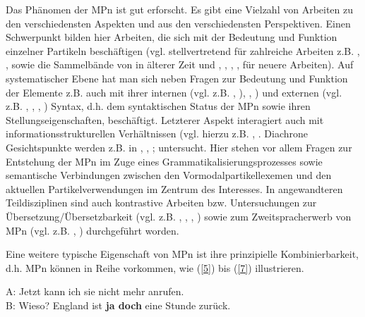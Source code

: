 Das Phänomen der MPn ist gut erforscht. Es gibt eine Vielzahl von Arbeiten zu den verschiedensten Aspekten und aus den verschiedensten Perspektiven. Einen Schwerpunkt bilden hier Arbeiten, die sich mit der Bedeutung und Funktion einzelner Partikeln beschäftigen (vgl. stellvertretend für zahlreiche Arbeiten z.B. \citealt{Franck1980}, \citealt{Hentschel1986}, \citealt{Thurmair1989} sowie die Sammelbände von \citealt{Weydt1977, Weydt1979, Weydt1983a, Weydt1986} in älterer Zeit und \citealt{Karagjosova2003, Karagjosova2004}, \citealt{Zimmermann2011}, \citealt{Egg2013}, \citealt{Mueller2014a, Mueller2016a}, \citealt{Gutzmann2015} für neuere Arbeiten). Auf systematischer Ebene hat man sich neben Fragen zur Bedeutung und Funktion der Elemente z.B. auch mit ihrer internen (vgl. z.B. \citealt[50-63]{Meibauer1994}, \citealt[37-41]{Ormelius-Sandblom1997}), \citealt[99-104]{Coniglio2011}, \citealt{Struckmeier2014}) und externen (vgl. z.B. \citealt[32-36, 43-45]{Ormelius-Sandblom1997}, \citealt[104-115]{Coniglio2011}, \citealt{Abraham1995, Abraham2012}, \citealt{Gutzmann2016}) Syntax, d.h. dem syntaktischen Status der MPn sowie ihren Stellungseigenschaften, beschäftigt. Letz\-terer Aspekt interagiert auch mit informationsstrukturellen Verhältnissen (vgl. hierzu z.B. \citealt[73-87]{Meibauer1994}, \citealt[101-115]{Ormelius-Sandblom1997}. Diachrone Gesichtspunkte werden z.B. in \citet[Kapitel 3]{Hentschel1986}, \citet[158-170]{Meibauer1994}, \citet[Kapitel 4.2]{Diewald1997}; \citeyearpar{ Diewald2008} untersucht. Hier stehen vor allem Fragen zur Entstehung der MPn im Zuge eines Grammatikalisierungsprozesses sowie semantische Verbindungen zwischen den Vormodalpartikellexemen und den aktuellen Partikelverwendungen im Zentrum des Interesses. In angewandteren Teildisziplinen sind auch kontrastive Arbeiten bzw. Untersuchungen zur Übersetzung/Übersetzbarkeit (vgl. z.B. \citealt{Schubiger1965}, \citealt{Burkhardt1995}, \citealt{Masi1996}, \citealt{Diewald2010}) sowie zum Zweitspracherwerb von MPn (vgl. z.B. \citealt{Rost-Roth1999}, \citealt{Moellering2004}) durchgeführt worden.

Eine weitere typische Eigenschaft von MPn ist ihre prinzipielle Kombinierbarkeit, d.h. MPn können in Reihe vorkommen, wie (\ref{5}) bis (\ref{7}) illustrieren. 

\begin{exe}
	\ex\label{5} 
		A: Jetzt kann ich sie nicht mehr anrufen. \\
		B: Wieso? England ist \textbf{ja doch} eine Stunde zurück.
\end{exe}

